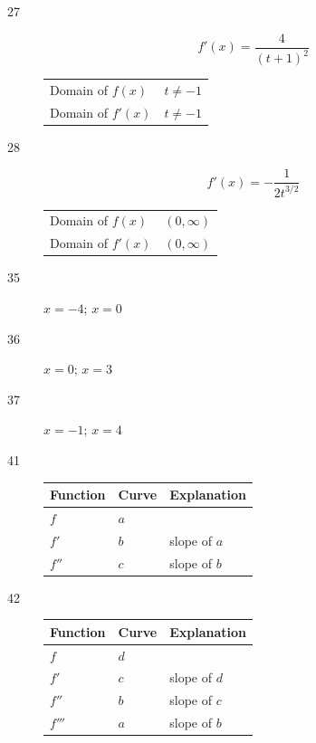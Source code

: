 \documentclass[letterpaper, landscape]{exam}
\begin{document}
\begin{description}
      \item[27]
        \[
          f'(x) = \frac{4}{(t + 1)^2}
        \]
        \begin{tabular}[H]{lr}
          \toprule
          Domain of $f(x)$  & $t \neq -1$ \\
          Domain of $f'(x)$ & $t \neq -1$ \\
          \bottomrule
        \end{tabular}

      \item[28]
        \[
          f'(x) = -\frac{ 1 }{ 2t^{3/2} }
        \]
        \begin{tabular}[H]{lr}
          \toprule
          Domain of $f(x)$  & $(0, \infty)$ \\
          Domain of $f'(x)$ & $(0, \infty)$ \\
          \bottomrule
        \end{tabular}

      \item[35] $x = -4$; $x = 0$

      \item[36] $x = 0$; $x = 3$

      \item[37] $x = -1$; $x = 4$

      \item[41]
        \begin{tabular}[H]{lll}
          \toprule
          Function & Curve & Explanation \\
          \midrule
          $f$      & $a$   & \\
          $f'$     & $b$   & slope of $a$ \\
          $f''$    & $c$   & slope of $b$ \\
          \bottomrule
        \end{tabular}

      \item[42]
        \begin{tabular}[H]{lll}
          \toprule
          Function & Curve & Explanation \\
          \midrule
          $f$      & $d$   & \\
          $f'$     & $c$   & slope of $d$ \\
          $f''$    & $b$   & slope of $c$ \\
          $f'''$   & $a$   & slope of $b$ \\
          \bottomrule
        \end{tabular}


\end{description}
\end{document}
